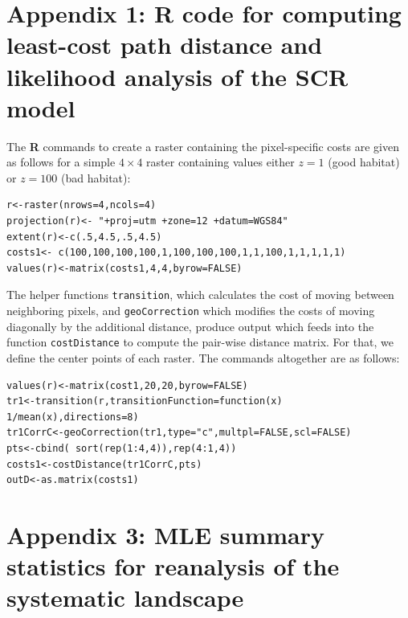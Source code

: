 \documentclass[12pt]{article}
\begin{document}



\newpage

\newpage


\section*{Appendix 1: {\bf R} code for computing least-cost path
  distance and likelihood analysis of the SCR model}


The {\bf R} commands to create a raster containing the pixel-specific
costs are given as follows for a simple $4\times 4$ raster containing
values either $z=1$ (good habitat) or $z=100$ (bad habitat):
\begin{verbatim}
r<-raster(nrows=4,ncols=4)
projection(r)<- "+proj=utm +zone=12 +datum=WGS84"
extent(r)<-c(.5,4.5,.5,4.5)
costs1<- c(100,100,100,100,1,100,100,100,1,1,100,1,1,1,1,1)
values(r)<-matrix(costs1,4,4,byrow=FALSE)
\end{verbatim}
The helper functions \mbox{\tt transition}, which
calculates the cost of moving between neighboring pixels, and
\mbox{\tt geoCorrection} which modifies the costs of moving diagonally
by the additional distance, produce output which feeds into the
function \mbox{\tt costDistance} to compute the pair-wise distance
matrix. For that, we define the center points of each raster.  The
commands altogether are as follows:

\begin{verbatim}
values(r)<-matrix(cost1,20,20,byrow=FALSE)
tr1<-transition(r,transitionFunction=function(x) 1/mean(x),directions=8)
tr1CorrC<-geoCorrection(tr1,type="c",multpl=FALSE,scl=FALSE)
pts<-cbind( sort(rep(1:4,4)),rep(4:1,4))
costs1<-costDistance(tr1CorrC,pts)
outD<-as.matrix(costs1)
\end{verbatim}



\newpage


\section*{Appendix 3:  MLE summary statistics for reanalysis of the
  systematic landscape}
\end{document}
